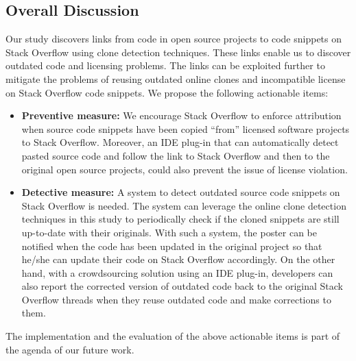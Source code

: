 \documentclass[10pt,journal,compsoc]{IEEEtran}
\begin{document}
\subsection{Overall Discussion}

Our study discovers links from code in open source projects to code
snippets on Stack Overflow using clone detection techniques. These
links enable us to discover outdated code and licensing problems. The
links can be exploited further to mitigate the problems of reusing
outdated online clones and incompatible license on Stack Overflow code
snippets. We propose the following actionable items:
\begin{itemize}
	\item \textbf{Preventive measure:} We encourage Stack Overflow to enforce attribution when source code snippets have been copied ``from'' licensed software projects to Stack Overflow. Moreover, an IDE plug-in that can automatically detect pasted source code and follow the link to Stack Overflow and then to the original open source projects, could also prevent the issue of license violation.
	\item \textbf{Detective measure:} A system to detect outdated source code
	snippets on Stack Overflow is needed. The system can leverage the
	online clone detection techniques in this study to periodically check
	if the cloned snippets are still up-to-date with their
	originals. %
	With such a system, the poster can be notified when the code has been
	updated in the original project so that he/she can update their code
	on Stack Overflow accordingly. On the other hand, with a crowdsourcing
	solution using an IDE plug-in, developers can also report the
	corrected version of outdated code back to the original Stack Overflow
	threads when they reuse outdated code and make corrections to them.
\end{itemize}
The implementation and the evaluation of the above actionable items is part of the agenda of our future work.
\end{document}
